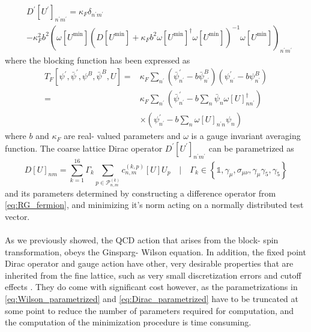 \documentclass[a4paper,10pt]{book}
\begin{document}
\begin{equation}\label{eq:RG_fermion}
\begin{aligned}
&D^{\prime}\left[U^{\prime}\right]_{n^{\prime} m^{\prime}}=\kappa_{F} \delta_{n^{\prime} m^{\prime}} \\
&-\kappa_{F}^{2} b^{2}\left(\omega\left[U^{\min }\right]\left(D\left[U^{\min }\right]+\kappa_{F} b^{2} \omega\left[U^{\min }\right]^{\dagger} \omega\left[U^{\min }\right]\right)^{-1} \omega\left[U^{\min }\right]\right)_{n^{\prime} m^{\prime}}
\end{aligned}
\end{equation}
where the blocking function has been expressed as 
\begin{equation}
\begin{aligned}
T_{F}\left[\psi^{\prime}, \bar{\psi}^{\prime}, \psi^{B}, \bar{\psi}^{B}, U\right]=& \kappa_{F} \sum_{n^{\prime}}\left(\bar{\psi}_{n^{\prime}}^{\prime}-b \bar{\psi}_{n^{\prime}}^{B}\right)\left(\psi_{n^{\prime}}^{\prime}-b \psi_{n^{\prime}}^{B}\right) \\
=& \kappa_{F} \sum_{n^{\prime}}\left(\bar{\psi}_{n^{\prime}}^{\prime}-b \sum_{n} \bar{\psi}_{n} \omega[U]_{n n^{\prime}}^{\dagger}\right) \\
& \times\left(\psi_{n^{\prime}}^{\prime}-b \sum_{n} \omega[U]_{n^{\prime} n} \psi_{n}\right)
\end{aligned}
\end{equation}
where $b$ and $\kappa_F$ are real- valued parameters and $\omega$ is a gauge invariant averaging function. The coarse lattice Dirac operator $D^{\prime}\left[U^{\prime}\right]_{n^{\prime} m^{\prime}}$ can be parametrized as 
\begin{equation}\label{eq:Dirac_parametrized}
D[U]_{n m}=\sum_{k=1}^{16} \Gamma_{k} \sum_{p \in \mathcal{P}_{n, m}^{(k)}} c_{n, m}^{(k, p)}[U] U_{p} \quad\big|\quad \Gamma_k\in \left\{\mathbb{1}, \gamma_{\mu}, \sigma_{\mu \nu}, \gamma_{\mu} \gamma_{5}, \gamma_{5}\right\}
\end{equation}
and its parameters determined by constructing a difference operator from \eqref{eq:RG_fermion}, and minimizing it's norm acting on a normally distributed test vector.\\\\As we previously showed, the QCD action that arises from the block- spin transformation, obeys the Ginsparg- Wilson equation. In addition, the fixed point Dirac operator and gauge action have other, very desirable properties that are inherited from the fine lattice, such as very small discretization errors and cutoff effects \cite{HASENFRATZ199853}. They do come with significant cost however, as the parametrizations   in \eqref{eq:Wilson_parametrized} and \eqref{eq:Dirac_parametrized} have to be truncated at some point to reduce the number of parameters required for computation, and the computation of the minimization procedure is time consuming.
\end{document}
